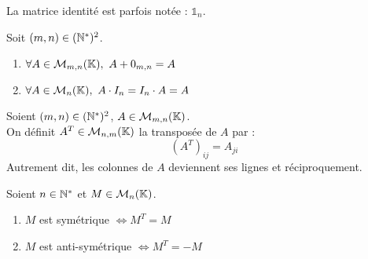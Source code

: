 \begin{remark}
    La matrice identité est parfois notée : $\mathds{1}_n$.
\end{remark}

\begin{lemma}
	Soit $(m,n) \in (\mathbb{N}^*)^2$.
	\begin{multicols}{2}
	    \begin{enumerate}
    		\item $\forall A \in \mathcal{M}_{m, n}(\K),\ A + 0_{m,n} = A$
    		\item $\forall A \in \mathcal{M}_{n}(\mathbb{K}),\ A \cdot I_n = I_n \cdot A = A$
    	\end{enumerate}
	\end{multicols}
\end{lemma}

\begin{definition}[Transposée]
	Soient $(m,n) \in (\mathbb{N}^*)^2$, $A \in \mathcal{M}_{m, n}(\mathbb{K})$.
	\\
	On définit $A^T \in \mathcal{M}_{n, m}(\mathbb{K})$ la transposée de $A$ par :
	\[(A^T)_{ij} = A_{ji}\]
    Autrement dit, les colonnes de $A$ deviennent ses lignes et réciproquement.
\end{definition}

\begin{definition}
	Soient $n \in \mathbb{N}^*$ et $M \in \mathcal{M}_n(\mathbb{K})$.
	\begin{multicols}{2}
	    \begin{enumerate}
    		\item $M$ est symétrique $\iff M^T = M$
    		\item $M$ est anti-symétrique $\iff M^T = -M$
    	\end{enumerate}
	\end{multicols}
\end{definition}

